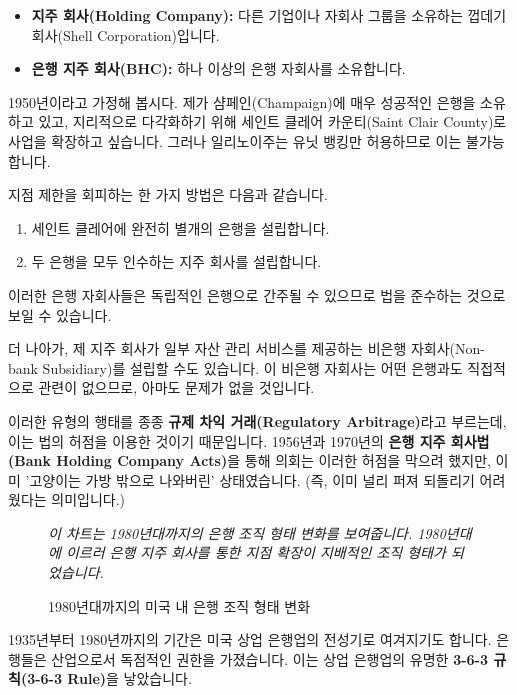 \documentclass[11pt,a4paper]{book}
\theoremstyle{definition}
\begin{document}
\begin{itemize}
    \item \textbf{지주 회사(Holding Company):} 다른 기업이나 자회사 그룹을 소유하는 껍데기 회사(Shell Corporation)입니다.
    \item \textbf{은행 지주 회사(BHC):} 하나 이상의 은행 자회사를 소유합니다.
\end{itemize}

\begin{examplebox}[title={규제 회피를 위한 은행 지주 회사 활용}]
1950년이라고 가정해 봅시다. 제가 샴페인(Champaign)에 매우 성공적인 은행을 소유하고 있고, 지리적으로 다각화하기 위해 세인트 클레어 카운티(Saint Clair County)로 사업을 확장하고 싶습니다. 그러나 일리노이주는 유닛 뱅킹만 허용하므로 이는 불가능합니다.

지점 제한을 회피하는 한 가지 방법은 다음과 같습니다.
\begin{enumerate}
    \item 세인트 클레어에 완전히 별개의 은행을 설립합니다.
    \item 두 은행을 모두 인수하는 지주 회사를 설립합니다.
\end{enumerate}
이러한 은행 자회사들은 독립적인 은행으로 간주될 수 있으므로 법을 준수하는 것으로 보일 수 있습니다.

더 나아가, 제 지주 회사가 일부 자산 관리 서비스를 제공하는 비은행 자회사(Non-bank Subsidiary)를 설립할 수도 있습니다. 이 비은행 자회사는 어떤 은행과도 직접적으로 관련이 없으므로, 아마도 문제가 없을 것입니다.
\end{examplebox}

이러한 유형의 행태를 종종 \textbf{규제 차익 거래(Regulatory Arbitrage)}라고 부르는데, 이는 법의 허점을 이용한 것이기 때문입니다. 1956년과 1970년의 \textbf{은행 지주 회사법(Bank Holding Company Acts)}을 통해 의회는 이러한 허점을 막으려 했지만, 이미 '고양이는 가방 밖으로 나와버린' 상태였습니다. (즉, 이미 널리 퍼져 되돌리기 어려웠다는 의미입니다.)

\begin{figure}[h!]
    \centering
    \caption{1980년대까지의 미국 내 은행 조직 형태 변화}
    \label{fig:banks_1980s}
    \textit{이 차트는 1980년대까지의 은행 조직 형태 변화를 보여줍니다. 1980년대에 이르러 은행 지주 회사를 통한 지점 확장이 지배적인 조직 형태가 되었습니다.}
\end{figure}

1935년부터 1980년까지의 기간은 미국 상업 은행업의 전성기로 여겨지기도 합니다. 은행들은 산업으로서 독점적인 권한을 가졌습니다. 이는 상업 은행업의 유명한 \textbf{3-6-3 규칙(3-6-3 Rule)}을 낳았습니다.
\end{document}
